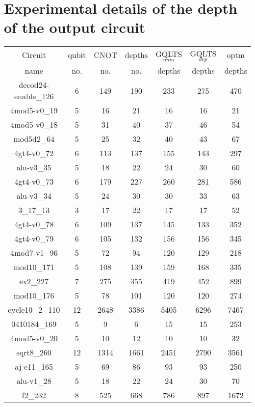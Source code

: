 \documentclass[runningheads]{llncs}
\begin{document}
\section{Experimental details of the depth of the output circuit}
					\begin{table}[H]
						\begin{center}  
						\begin{tabular}{|c|c|c|c|c|c|c|}
						\hline
						Circuit &  qubit  & CNOT &depths &GQLTS$_{num}$& GQLTS$_{dep}$  & optm 	  	\\
						 name	&   no. 	&	no. & no. & depths&  depths &  depths 	\\
						\hline
						decod24-enable\_126 & 6 & 149 & 190 & 233 & 275 & 470 \\
4mod5-v0\_19 & 5 & 16 & 21 & 16 & 16 & 21 \\
4mod5-v0\_18 & 5 & 31 & 40 & 37 & 46 & 54 \\
mod5d2\_64 & 5 & 25 & 32 & 40 & 43 & 67 \\
4gt4-v0\_72 & 6 & 113 & 137 & 155 & 143 & 297 \\
alu-v3\_35 & 5 & 18 & 22 & 24 & 30 & 60 \\
4gt4-v0\_73 & 6 & 179 & 227 & 260 & 281 & 586 \\
alu-v3\_34 & 5 & 24 & 30 & 30 & 33 & 63 \\
3\_17\_13 & 3 & 17 & 22 & 17 & 17 & 52 \\
4gt4-v0\_78 & 6 & 109 & 137 & 145 & 133 & 352 \\
4gt4-v0\_79 & 6 & 105 & 132 & 156 & 156 & 345 \\
4mod7-v1\_96 & 5 & 72 & 94 & 120 & 129 & 218 \\
mod10\_171 & 5 & 108 & 139 & 159 & 168 & 335 \\
ex2\_227 & 7 & 275 & 355 & 419 & 452 & 899 \\
mod10\_176 & 5 & 78 & 101 & 120 & 120 & 274 \\
cycle10\_2\_110 & 12 & 2648 & 3386 & 5405 & 6296 & 7467 \\
0410184\_169 & 5 & 9 & 6 & 15 & 15 & 253 \\
4mod5-v0\_20 & 5 & 10 & 12 & 10 & 10 & 32 \\
sqrt8\_260 & 12 & 1314 & 1661 & 2451 & 2790 & 3561 \\
aj-e11\_165 & 5 & 69 & 86 & 93 & 93 & 250 \\
alu-v1\_28 & 5 & 18 & 22 & 24 & 30 & 70 \\
f2\_232 & 8 & 525 & 668 & 786 & 897 & 1672 \\

\end{tabular}
\end{center}
\end{table}
\end{document}
